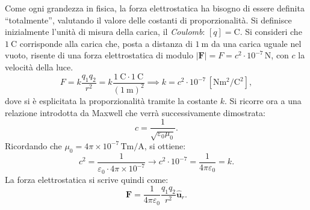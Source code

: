\documentclass[a4paper,11pt]{report}
\begin{document}
\begin{approfondimento}[ title={La costante di proporzionalità: \texorpdfstring{$\bm{\varepsilon_0}$}{epsilon zero}}]
\noindent
Come ogni grandezza in fisica, la forza elettrostatica ha bisogno di essere definita ``totalmente'', valutando il valore delle costanti di proporzionalità. Si definisce inizialmente l'unità di misura della carica, il \textit{Coulomb}: $[q] = \text{C}$.
Si consideri che $\SI{1}{\coulomb}$ corrisponde alla carica che, posta a distanza di $\SI{1}{\meter}$ da una carica uguale nel vuoto, risente di una forza elettrostatica di modulo $|\bm{F}| = F = c^2 \cdot 10^{-7} \, \si{\newton}$, con $c$ la velocità della luce.
\begin{equation}
    F = k \frac{q_1q_2}{r^2} = k \frac{\SI{1}{\coulomb}\cdot \SI{1}{\coulomb}}{(\SI{1}{\meter})^2} \implies k = c^2 \cdot 10^{-7} \, [\si{\newton\meter\squared\per\coulomb\squared}],
\end{equation}
dove si è esplicitata la proporzionalità tramite la costante $k$. Si ricorre ora a una relazione introdotta da Maxwell che verrà successivamente dimostrata:
\begin{equation}
    c = \frac{1}{\sqrt{\varepsilon_0 \mu_0}}.
\end{equation}
Ricordando che $\mu_0 = 4\pi \times 10^{-7} \, \si{\tesla\meter\per\ampere}$, si ottiene:
\begin{equation}
    c^2 = \frac{1}{\varepsilon_0\cdot 4\pi \times 10^{-7}} \rightarrow c^2 \cdot 10^{-7} = \frac{1}{4\pi\varepsilon_0 } = k.
\end{equation}
La forza elettrostatica si scrive quindi come:
\begin{equation}
    \boxed{\bm{F} = \frac{1}{4 \pi \varepsilon_0} \frac{q_1q_2}{r^2}\hat{\bm{u}}_r}. \label{eq:coulomb_completa}
\end{equation}
    \end{approfondimento}
\end{document}
